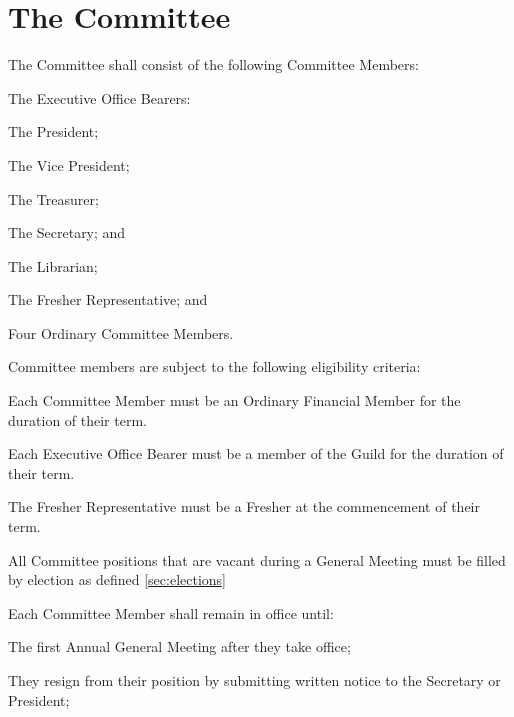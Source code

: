 \documentclass[a4paper]{article}
\begin{document}
\section{The Committee} \label{sec:committee}
\begin{myEnumerate}
    \item The Committee shall consist of the following Committee Members:
        \begin{myEnumerate}
            \item The Executive Office Bearers:
                \begin{myEnumerate}
                    \item The President;
                    \item The Vice President;
                    \item The Treasurer;
                    \item The Secretary; and
                    \item The Librarian;
                \end{myEnumerate}
            \item The Fresher Representative; and
            \item Four Ordinary Committee Members.
        \end{myEnumerate}
    \item Committee members are subject to the following eligibility criteria:
        \begin{myEnumerate}
            \item Each Committee Member must be an Ordinary Financial Member for the duration of their term.
            \item Each Executive Office Bearer must be a member of the Guild for the duration of their term.
            \item The Fresher Representative must be a Fresher at the commencement of their term.
        \end{myEnumerate}
    \item All Committee positions that are vacant during a General Meeting must be filled by election as defined \cref{sec:elections}
    \item Each Committee Member shall remain in office until: 
        \begin{myEnumerate}
            \item The first Annual General Meeting after they take office;
            \item They resign from their position by submitting written notice to the Secretary or President;

\end{myEnumerate}
\end{myEnumerate}
\end{document}
